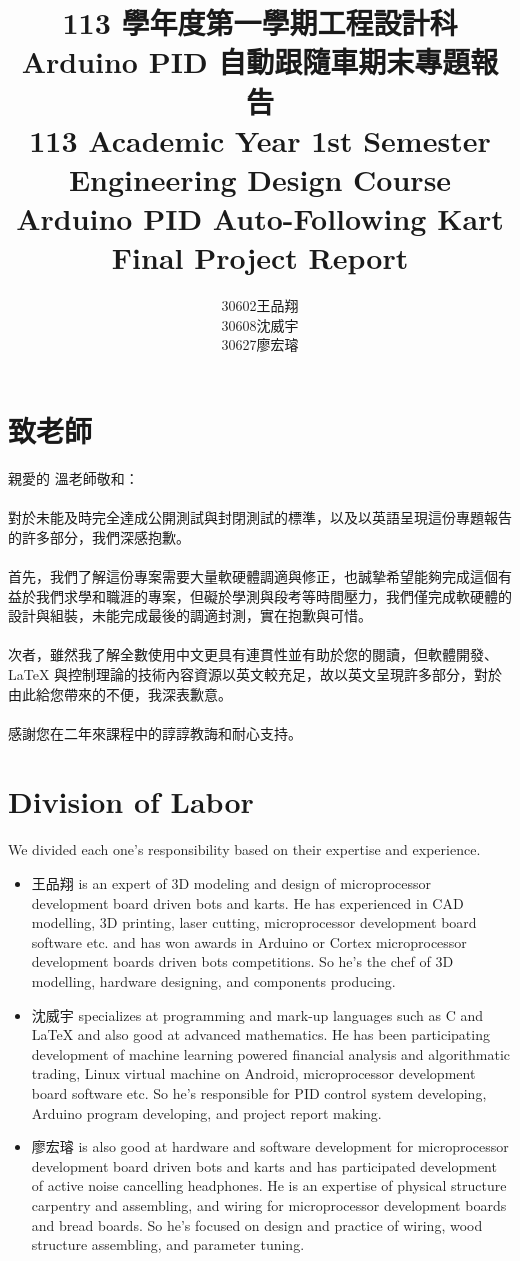 \documentclass[a4paper,12pt]{report}
\begin{document}
\title{
\Large 113 學年度第一學期工程設計科\\
\huge Arduino PID 自動跟隨車期末專題報告\\
\Large 113 Academic Year 1st Semester Engineering Design Course\\
\huge Arduino PID Auto-Following Kart Final Project Report
}
\author{30602王品翔\\30608沈威宇\\30627廖宏璿}
\date{\temtoday}
\titletocdoc
\section{致老師}
親愛的 溫老師敬和：\\\\
對於未能及時完全達成公開測試與封閉測試的標準，以及以英語呈現這份專題報告的許多部分，我們深感抱歉。\\\\
首先，我們了解這份專案需要大量軟硬體調適與修正，也誠摯希望能夠完成這個有益於我們求學和職涯的專案，但礙於學測與段考等時間壓力，我們僅完成軟硬體的設計與組裝，未能完成最後的調適封測，實在抱歉與可惜。\\\\
次者，雖然我了解全數使用中文更具有連貫性並有助於您的閱讀，但軟體開發、\LaTeX{} 與控制理論的技術內容資源以英文較充足，故以英文呈現許多部分，對於由此給您帶來的不便，我深表歉意。\\\\
感謝您在二年來課程中的諄諄教誨和耐心支持。

\section{Division of Labor}
We divided each one's responsibility based on their expertise and experience.
\begin{itemize}
\item 王品翔 is an expert of 3D modeling and design of microprocessor development board driven bots and karts. He has experienced in CAD modelling, 3D printing, laser cutting, microprocessor development board software etc. and has won awards in Arduino or Cortex microprocessor development boards driven bots competitions. So he's the chef of 3D modelling, hardware designing, and components producing.
\item 沈威宇 specializes at programming and mark-up languages such as C and LaTeX and also good at advanced mathematics. He has been participating development of machine learning powered financial analysis and algorithmatic trading, Linux virtual machine on Android, microprocessor development board software etc. So he's responsible for PID control system developing, Arduino program developing, and project report making.
\item 廖宏璿 is also good at hardware and software development for microprocessor development board driven bots and karts and has participated development of active noise cancelling headphones. He is an expertise of physical structure carpentry and assembling, and wiring for microprocessor development boards and bread boards. So he's focused on design and practice of wiring, wood structure assembling, and parameter tuning.
\end{itemize}
\end{document}
